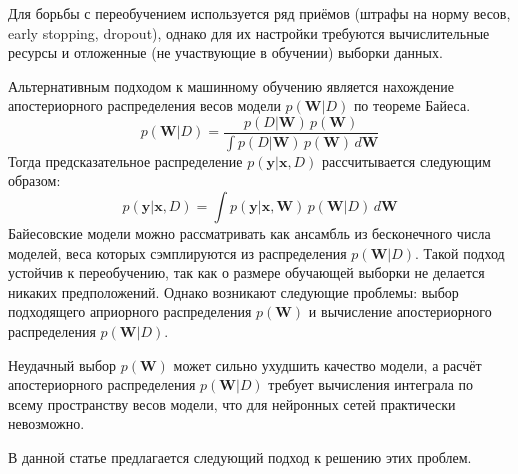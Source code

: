 \documentclass{article}
\begin{document}
    Для борьбы с переобучением используется ряд приёмов (штрафы на норму весов, early stopping, dropout),
    однако для их настройки требуются вычислительные ресурсы и отложенные
    (не участвующие в обучении) выборки данных.

    Альтернативным подходом к машинному обучению является нахождение апостериорного распределения весов модели $p(\pmb{W}| D)$ по теореме Байеса.
    \[
        p(\pmb{W}| D)
        =
        \frac
            {
                p(D | \pmb{W})
                \,
                p(\pmb{W})
            }
            {
                \int{
                    p(D | \pmb{W})
                    \,
                    p(\pmb{W})
                    \,
                    d\pmb{W}
                }
            }
    \]
    Тогда предсказательное распределение $p(\pmb{y} | \pmb{x}, D)$ рассчитывается следующим образом:
    \[
        p(\pmb{y} | \pmb{x}, D)
        =
        \int{
            p(\pmb{y} | \pmb{x}, \pmb{W})
            \,
            p(\pmb{W} | D)
            \,
            d\pmb{W}
        }
    \]
    Байесовские модели можно рассматривать как ансамбль из бесконечного числа моделей,
    веса которых сэмплируются из распределения
    $p(\pmb{W}| D)$.
    Такой подход устойчив к переобучению, так как о размере обучающей выборки не делается никаких предположений.
    Однако возникают следующие проблемы: выбор подходящего априорного распределения
    $p(\pmb{W})$
    и вычисление апостериорного распределения
    $p(\pmb{W}| D)$.

    Неудачный выбор $p(\pmb{W})$ может сильно ухудшить качество модели,
    а расчёт апостериорного распределения $p(\pmb{W}| D)$
    требует вычисления интеграла по всему пространству весов модели,
    что для нейронных сетей практически невозможно.

    В данной статье предлагается следующий подход к решению этих проблем.
\end{document}
